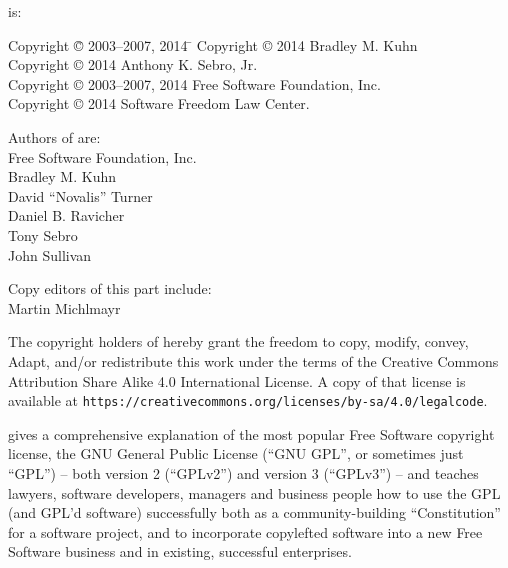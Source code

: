 {\parindent 0in
 is: \\
\begin{tabbing}
Copyright \= \copyright{} 2003--2007, 2014 \hspace{.1mm} \=  \kill
Copyright \> \copyright{} 2014 \> Bradley M. Kuhn \\
Copyright \> \copyright{} 2014 \>  Anthony K. Sebro, Jr. \\
Copyright \> \copyright{} 2003--2007, 2014 \>  Free Software Foundation, Inc. \\
Copyright \> \copyright{} 2014 \>  Software Freedom Law Center.
\end{tabbing}


\vspace{.3in}

\begin{center}
Authors of  are: \\
Free Software Foundation, Inc. \\
Bradley M. Kuhn \\
David ``Novalis'' Turner \\
Daniel B. Ravicher \\
Tony Sebro \\
John Sullivan

\vspace{.2in}

Copy editors of this part include: \\
Martin Michlmayr

\vspace{.2in}


The copyright holders of  hereby grant the freedom to copy, modify,
convey, Adapt, and/or redistribute this work under the terms of the Creative
Commons Attribution Share Alike 4.0 International License.  A copy of that
license is available at
\verb=https://creativecommons.org/licenses/by-sa/4.0/legalcode=.
\end{center}
}

\bigskip

 gives a
comprehensive explanation of the most popular Free Software copyright
license, the GNU General Public License (``GNU GPL'', or sometimes just
``GPL'') -- both version 2 (``GPLv2'') and version 3 (``GPLv3'') -- and
teaches lawyers, software developers, managers and business people how to use
the GPL (and GPL'd software) successfully both as a community-building
``Constitution'' for a software project, and to incorporate copylefted
software into a new Free Software business and in existing, successful
enterprises.

